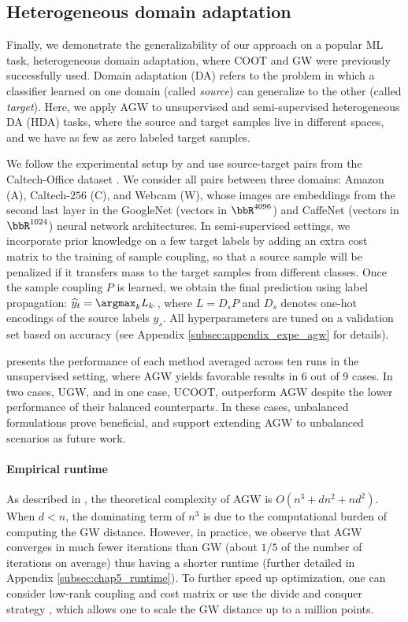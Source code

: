 \subsection{Heterogeneous domain adaptation}

Finally, we demonstrate the generalizability of our approach on a popular ML task,
heterogeneous domain adaptation, where COOT and GW were previously successfully used.
Domain adaptation (DA) refers to the problem in which a classifier learned on one domain
(called \textit{source}) can generalize to the other (called \textit{target}). Here,
we apply AGW to unsupervised and semi-supervised heterogeneous DA (HDA) tasks,
where the source and target samples live in different spaces, and we have as few as
zero labeled target samples.

We follow the experimental setup by \citep{Redko20} and use source-target pairs
from the Caltech-Office dataset \citep{Saenko10}. We consider all pairs between three domains:
Amazon (A), Caltech-$256$ (C), and Webcam (W), whose images are embeddings from
the second last layer in the GoogleNet \citep{Szegedy15} (vectors in $\bbR^{4096}$)
and CaffeNet \citep{Jia14} (vectors in $\bbR^{1024}$) neural network architectures.
In semi-supervised settings, we incorporate prior knowledge on a few target labels
by adding an extra cost matrix to the training of sample coupling, so that
a source sample will be penalized if it transfers mass to the target samples from different classes.
Once the sample coupling $P$ is learned, we obtain the final prediction using label propagation:
$\widehat{y}_t = \argmax_k L_{k\cdot}$,
where $L = D_s P$ and $D_s$ denotes one-hot encodings of the source labels $y_s$.
All hyperparameters are tuned on a validation set based on accuracy
(see Appendix \ref{subsec:appendix_expe_agw} for details).

 presents the performance of each method averaged across ten runs in
the unsupervised setting, where AGW yields favorable results in 6 out of 9 cases. In two cases,
UGW, and in one case, UCOOT, outperform AGW despite the lower performance of
their balanced counterparts. In these cases, unbalanced formulations prove beneficial,
and support extending AGW to unbalanced scenarios as future work.

\paragraph{Empirical runtime} As described in ,
the theoretical complexity of AGW is $O(n^3 + dn^2 + nd^2)$. When $d<n$,
the dominating term of $n^3$ is due to the computational burden of computing the GW distance.
However, in practice, we observe that AGW converges in much fewer iterations than GW
(about $1/5$ of the number of iterations on average) thus having a shorter runtime
(further detailed in Appendix \ref{subsec:chap5_runtime}). To further speed up optimization,
one can consider low-rank coupling and cost matrix \citep{Meyer21b} or
use the divide and conquer strategy \citep{Chowdhury21a},
which allows one to scale the GW distance up to a million points.

